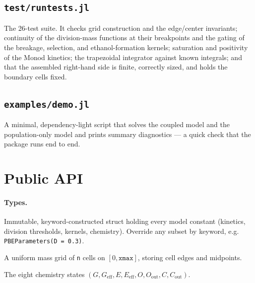 \documentclass[11pt,a4paper]{article}
\begin{document}


\subsection{\texttt{test/runtests.jl}}
The 26-test suite. It checks grid construction and the edge/center invariants; continuity of the
division-mass functions at their breakpoints and the gating of the breakage, selection, and
ethanol-formation kernels; saturation and positivity of the Monod kinetics; the trapezoidal integrator
against known integrals; and that the assembled right-hand side is finite, correctly sized, and holds the
boundary cells fixed.



\subsection{\texttt{examples/demo.jl}}
A minimal, dependency-light script that solves the coupled model and the population-only model and prints
summary diagnostics --- a quick check that the package runs end to end.



\section{Public API}

\paragraph{Types.}
\begin{description}[leftmargin=1.5em, style=nextline]
\item[\texttt{PBEParameters}] Immutable, keyword-constructed struct holding every model constant
(kinetics, division thresholds, kernels, chemistry). Override any subset by keyword, e.g.
\texttt{PBEParameters(D = 0.3)}.
\item[\texttt{MassGrid(n; xmax)}] A uniform mass grid of \texttt{n} cells on $[0,\texttt{xmax}]$,
storing cell edges and midpoints.
\item[\texttt{ChemState}] The eight chemistry states $(G, G_{\mathrm{eff}}, E, E_{\mathrm{eff}}, O, O_{\mathrm{out}}, C, C_{\mathrm{out}})$.
\end{description}
\end{document}

